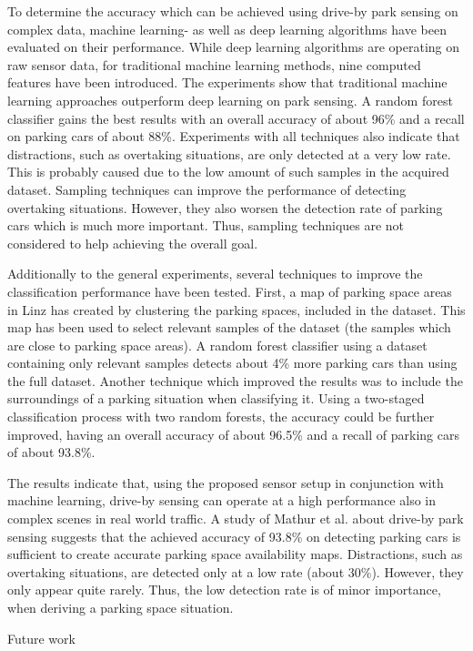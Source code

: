 
To determine the accuracy which can be achieved using drive-by park sensing on complex data, machine learning- as well as deep learning algorithms have been evaluated on their performance. While deep learning algorithms are operating on raw sensor data, for traditional machine learning methods, nine computed features have been introduced. The experiments show that traditional machine learning approaches outperform deep learning on park sensing. A random forest classifier gains the best results with an overall accuracy of about 96\% and a recall on parking cars of about 88\%. Experiments with all techniques also indicate that distractions, such as overtaking situations, are only detected at a very low rate. This is probably caused due to the low amount of such samples in the acquired dataset. Sampling techniques can improve the performance of detecting overtaking situations. However, they also worsen the detection rate of parking cars which is much more important. Thus, sampling techniques are not considered to help achieving the overall goal.

Additionally to the general experiments, several techniques to improve the classification performance have been tested. First, a map of parking space areas in Linz has created by clustering the parking spaces, included in the dataset. This map has been used to select relevant samples of the dataset (the samples which are close to parking space areas). A random forest classifier using a dataset containing only relevant samples detects about 4\% more parking cars than using the full dataset. Another technique which improved the results was to include the surroundings of a parking situation when classifying it. Using a two-staged classification process with two random forests, the accuracy could be further improved, having an overall accuracy of about 96.5\% and a recall of parking cars of about 93.8\%.

The results indicate that, using the proposed sensor setup in conjunction with machine learning, drive-by sensing can operate at a high performance also in complex scenes in real world traffic. 
A study of Mathur et al. about drive-by park sensing \cite{Mathur:2010:PDS:1814433.1814448} suggests that the achieved accuracy of 93.8\% on detecting parking cars is sufficient to create accurate parking space availability maps.
Distractions, such as overtaking situations, are detected only at a low rate (about 30\%). However, they only appear quite rarely. Thus, the low detection rate is of minor importance, when deriving a parking space situation.

Future work










